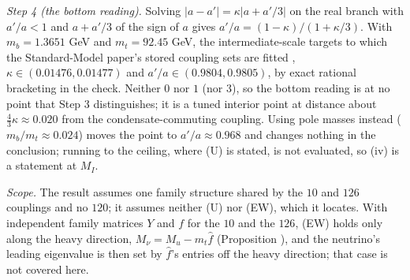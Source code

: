 \emph{Step 4 (the bottom reading).} Solving $|a - a'| = \kappa |a + a'/3|$ on the real branch with $a'/a < 1$ and $a + a'/3$ of the sign of $a$ gives $a'/a = (1 - \kappa)/(1 + \kappa/3)$. With $m_{b} = 1.3651$ GeV and $m_{t} = 92.45$ GeV, the intermediate-scale targets to which the Standard-Model paper's stored coupling sets are fitted \cite{ButlerT12}, $\kappa \in (0.01476, 0.01477)$ and $a'/a \in (0.9804, 0.9805)$, by exact rational bracketing in the check. Neither $0$ nor $1$ (nor $3$), so the bottom reading is at no point that Step 3 distinguishes; it is a tuned interior point at distance about $\tfrac43\kappa \approx 0.020$ from the condensate-commuting coupling. Using pole masses instead ($m_{b}/m_{t} \approx 0.024$) moves the point to $a'/a \approx 0.968$ and changes nothing in the conclusion; running to the ceiling, where (U) is stated, is not evaluated, so (iv) is a statement at $M_{I}$.

\emph{Scope.} The result assumes one family structure shared by the $10$ and $126$ couplings and no $120$; it assumes neither (U) nor (EW), which it locates. With independent family matrices $Y$ and $f$ for the $10$ and the $126$, (EW) holds only along the heavy direction, $M_{\nu} = M_{u} - m_{t}\hat{f}$ (Proposition ), and the neutrino's leading eigenvalue is then set by $\hat{f}$'s entries off the heavy direction; that case is not covered here.
